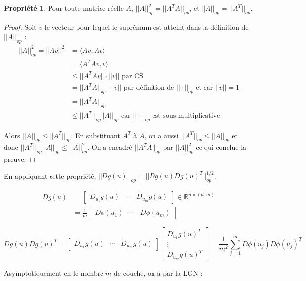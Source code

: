 \documentclass[a4paper, 11pt, french]{article}
\theoremstyle{definition}
\newtheorem{property}{Propriété}
\begin{document}
\begin{property}
	Pour toute matrice réelle $A$, $||A||_{op}^2 = ||A^T A||_{op}$, et $||A||_{op} = ||A^T||_{op}$.
\end{property}
\begin{proof}
	Soit $v$ le vecteur pour lequel le suprémum est atteint dans la définition de $||A||_{op}$ :
	\begin{align*}
		||A||_{op}^2 = ||Av||^2 &= \langle Av, Av \rangle \\
		&= \langle A^T Av, v \rangle \\
		&\leq ||A^T Av|| \cdot ||v|| \text{ par CS}\\
		&= ||A^T A||_{op} \cdot ||v|| \text{ par définition de $||\cdot||_{op}$ et car $||v|| = 1$}\\
		&= ||A^T A||_{op} \\
		&\leq ||A^T||_{op} ||A||_{op} \text{ car $||\cdot||_{op}$ est sous-multiplicative}
	\end{align*}
	
	Alors $||A||_{op} \leq ||A^T||_{op}$. En substituant $A^T$ à $A$, on a aussi $||A^T||_{op} \leq ||A||_{op}$ et donc $||A^T||_{op} ||A||_{op} \leq ||A||_{op}^2$. On a encadré $||A^T A||_{op}$ par $||A||_{op}^2$ ce qui conclue la preuve.
\end{proof}

En appliquant cette propriété, $||Dg(u)||_{op} = ||Dg(u)Dg(u)^T||_{op}^{1/2}$.

\begin{align*}
	Dg(u) &=
	\begin{bmatrix}
		D_{u_1}g(u) & \cdots & D_{u_m}g(u)
	\end{bmatrix} \in \mathbb{R}^{n \times (d\cdot m)}\\
	&= \frac{1}{m} \begin{bmatrix}
		D \phi(u_1) & \cdots & D \phi(u_m)
	\end{bmatrix}
\end{align*}

\[ 
Dg(u) Dg(u)^T =
\begin{bmatrix}
	D_{u_1}g(u) & \cdots & D_{u_m}g(u)
\end{bmatrix}
\begin{bmatrix}
	D_{u_1}g(u)^T \\
	\vdots \\
	D_{u_m}g(u)^T
\end{bmatrix}
= \frac{1}{m^2} \sum_{j=1}^{m} D \phi(u_j) D \phi(u_j)^T
\]

Asymptotiquement en le nombre $m$ de couche, on a par la LGN :
\end{document}
